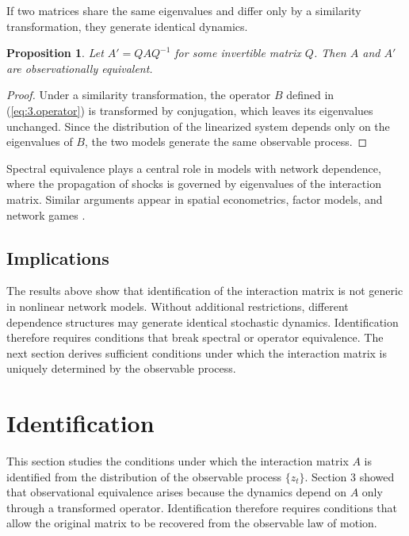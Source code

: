 \documentclass[12pt]{article}
\numberwithin{equation}{section}
\newtheorem{proposition}[theorem]{Proposition}
\begin{document}
If two matrices share the same eigenvalues and differ only by a similarity
transformation, they generate identical dynamics.

\begin{proposition}
Let $A' = Q A Q^{-1}$ for some invertible matrix $Q$. Then $A$ and $A'$
are observationally equivalent.
\end{proposition}

\begin{proof}
Under a similarity transformation, the operator $B$ defined in
(\ref{eq:3.operator}) is transformed by conjugation, which leaves its
eigenvalues unchanged. Since the distribution of the linearized system
depends only on the eigenvalues of $B$, the two models generate the same
observable process.
\end{proof}

Spectral equivalence plays a central role in models with network dependence,
where the propagation of shocks is governed by eigenvalues of the
interaction matrix. Similar arguments appear in spatial econometrics,
factor models, and network games
\citep{anselin1988spatial, bai2003inferential, jackson2010social,
acemoglu2012network}.

\subsection{Implications}

The results above show that identification of the interaction matrix is not
generic in nonlinear network models. Without additional restrictions,
different dependence structures may generate identical stochastic dynamics.
Identification therefore requires conditions that break spectral or operator
equivalence. The next section derives sufficient conditions under which the
interaction matrix is uniquely determined by the observable process.

\section{Identification}

This section studies the conditions under which the interaction matrix $A$
is identified from the distribution of the observable process $\{z_t\}$.
Section 3 showed that observational equivalence arises because the dynamics
depend on $A$ only through a transformed operator. Identification therefore
requires conditions that allow the original matrix to be recovered from the
observable law of motion.
\end{document}

